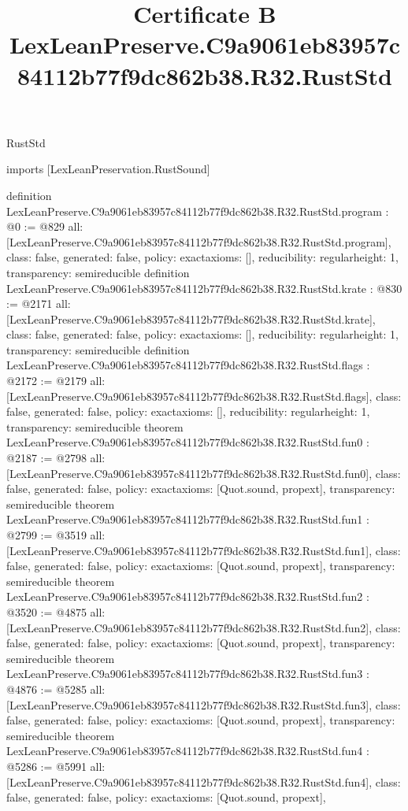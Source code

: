 \begin{lexlean}{RustStd}
\title{Certificate B LexLeanPreserve.C9a9061eb83957c84112b77f9dc862b38.R32.RustStd}
\begin{coremodule}
imports [LexLeanPreservation.RustSound]

definition LexLeanPreserve.C9a9061eb83957c84112b77f9dc862b38.R32.RustStd.program : @0 := @829 {
  all: [LexLeanPreserve.C9a9061eb83957c84112b77f9dc862b38.R32.RustStd.program],
  class: false,
  generated: false,
  policy: exact{axioms: []},
  reducibility: regular{height: 1},
  transparency: semireducible
}
definition LexLeanPreserve.C9a9061eb83957c84112b77f9dc862b38.R32.RustStd.krate : @830 := @2171 {
  all: [LexLeanPreserve.C9a9061eb83957c84112b77f9dc862b38.R32.RustStd.krate],
  class: false,
  generated: false,
  policy: exact{axioms: []},
  reducibility: regular{height: 1},
  transparency: semireducible
}
definition LexLeanPreserve.C9a9061eb83957c84112b77f9dc862b38.R32.RustStd.flags : @2172 := @2179 {
  all: [LexLeanPreserve.C9a9061eb83957c84112b77f9dc862b38.R32.RustStd.flags],
  class: false,
  generated: false,
  policy: exact{axioms: []},
  reducibility: regular{height: 1},
  transparency: semireducible
}
theorem LexLeanPreserve.C9a9061eb83957c84112b77f9dc862b38.R32.RustStd.fun0 : @2187 := @2798 {
  all: [LexLeanPreserve.C9a9061eb83957c84112b77f9dc862b38.R32.RustStd.fun0],
  class: false,
  generated: false,
  policy: exact{axioms: [Quot.sound, propext]},
  transparency: semireducible
}
theorem LexLeanPreserve.C9a9061eb83957c84112b77f9dc862b38.R32.RustStd.fun1 : @2799 := @3519 {
  all: [LexLeanPreserve.C9a9061eb83957c84112b77f9dc862b38.R32.RustStd.fun1],
  class: false,
  generated: false,
  policy: exact{axioms: [Quot.sound, propext]},
  transparency: semireducible
}
theorem LexLeanPreserve.C9a9061eb83957c84112b77f9dc862b38.R32.RustStd.fun2 : @3520 := @4875 {
  all: [LexLeanPreserve.C9a9061eb83957c84112b77f9dc862b38.R32.RustStd.fun2],
  class: false,
  generated: false,
  policy: exact{axioms: [Quot.sound, propext]},
  transparency: semireducible
}
theorem LexLeanPreserve.C9a9061eb83957c84112b77f9dc862b38.R32.RustStd.fun3 : @4876 := @5285 {
  all: [LexLeanPreserve.C9a9061eb83957c84112b77f9dc862b38.R32.RustStd.fun3],
  class: false,
  generated: false,
  policy: exact{axioms: [Quot.sound, propext]},
  transparency: semireducible
}
theorem LexLeanPreserve.C9a9061eb83957c84112b77f9dc862b38.R32.RustStd.fun4 : @5286 := @5991 {
  all: [LexLeanPreserve.C9a9061eb83957c84112b77f9dc862b38.R32.RustStd.fun4],
  class: false,
  generated: false,
  policy: exact{axioms: [Quot.sound, propext]},
}
\end{coremodule}
\end{lexlean}
